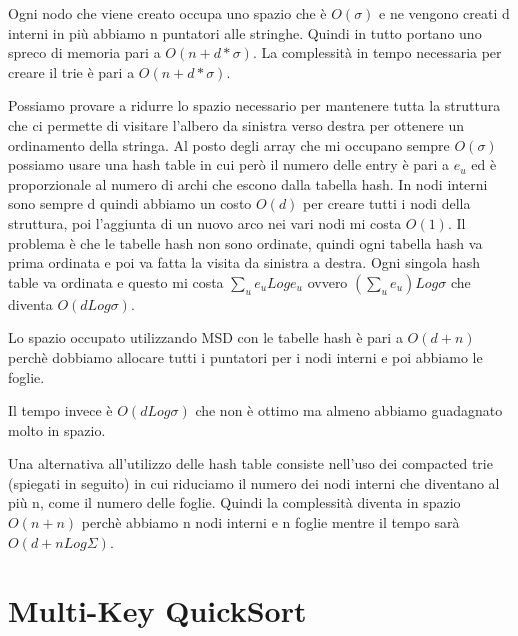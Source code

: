 \documentclass[14pt]{extreport}
\begin{document}
Ogni nodo che viene creato occupa uno spazio che è $O(\sigma)$ e ne vengono creati d interni in più abbiamo n puntatori alle stringhe. Quindi in tutto portano uno spreco di memoria pari a $O(n+d*\sigma)$. La complessità in tempo necessaria per creare il trie è pari a $O(n+d*\sigma)$.

Possiamo provare a ridurre lo spazio necessario per mantenere tutta la struttura che ci permette di visitare l'albero da sinistra verso destra per ottenere un ordinamento della stringa.
Al posto degli array che mi occupano sempre $O(\sigma)$ possiamo usare una hash table in cui però il numero delle entry è pari a $e_u$ ed è proporzionale al numero di archi che escono dalla tabella hash. 
In nodi interni sono sempre d quindi abbiamo un costo $O(d)$ per creare tutti i nodi della struttura, poi l'aggiunta di un nuovo arco nei vari nodi mi costa $O(1)$.
Il problema è che le tabelle hash non sono ordinate, quindi ogni tabella hash va prima ordinata e poi va fatta la visita da sinistra a destra.
Ogni singola hash table va ordinata e questo mi costa
\newline
$\sum_u e_u Log e_u$ ovvero $(\sum_u e_u) Log \sigma$ che diventa $O(d Log \sigma)$.

Lo spazio occupato utilizzando MSD con le tabelle hash è pari a $O(d+n)$ perchè dobbiamo allocare tutti i puntatori per i nodi interni e poi abbiamo le foglie.

Il tempo invece è $O(d Log \sigma)$ che non è ottimo ma almeno abbiamo guadagnato molto in spazio.

Una alternativa all'utilizzo delle hash table consiste nell'uso dei compacted trie (spiegati in seguito) in cui riduciamo il numero dei nodi interni che diventano al più n, come il numero delle foglie. Quindi la complessità diventa in spazio $O(n+n)$ perchè abbiamo n nodi interni e n foglie mentre il tempo sarà $O(d+nLog\Sigma)$.

\section{Multi-Key QuickSort}
\end{document}
